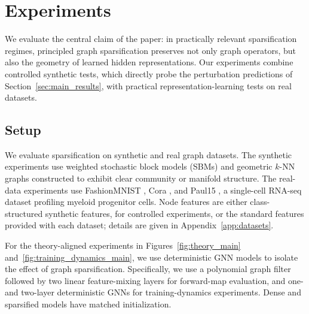 \documentclass{article}
\begin{document}



\section{Experiments}
\label{sec:experiments}

We evaluate the central claim of the paper: in practically relevant sparsification regimes, principled graph sparsification preserves not only graph operators, but also the geometry of learned hidden representations. Our experiments combine controlled synthetic tests, which directly probe the perturbation predictions of Section~\ref{sec:main_results}, with practical representation-learning tests on real datasets.

\subsection{Setup}
\label{subsec:exp_setup_main}

We evaluate sparsification on synthetic and real graph datasets. The synthetic experiments use weighted stochastic block models (SBMs) and geometric $k$-NN graphs constructed to exhibit clear community or manifold structure. The real-data experiments use FashionMNIST \citep{xiao2017fashion}, Cora \citep{sen2008collective}, and Paul15 \citep{paul2015transcriptional}, a single-cell RNA-seq dataset profiling myeloid progenitor cells. Node features are either class-structured synthetic features, for controlled experiments, or the standard features provided with each dataset; details are given in Appendix~\ref{app:datasets}.

For the theory-aligned experiments in Figures~\ref{fig:theory_main} and~\ref{fig:training_dynamics_main}, we use deterministic GNN models to isolate the effect of graph sparsification. Specifically, we use a polynomial graph filter followed by two linear feature-mixing layers for forward-map evaluation, and one- and two-layer deterministic GNNs for training-dynamics experiments. Dense and sparsified models have matched initialization.
\end{document}
